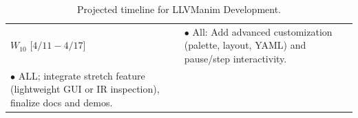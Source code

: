\begin{table}[htbp]
\begin{tabularx}{\columnwidth}{|>{\centering\arraybackslash}m{2.5cm}|>{\raggedright\arraybackslash}X|}
$W_{10}$ [$4/11 - 4/17$] & $\bullet$ All: Add advanced customization (palette, layout, YAML) and pause/step interactivity.\\ \newline 
 $\bullet$  ALL; integrate stretch feature (lightweight GUI or IR inspection), finalize docs and demos. \\ \hline 
\end{tabularx}
\vspace{0.1cm}
\caption{Projected timeline for LLVManim Development.}
\end{table}